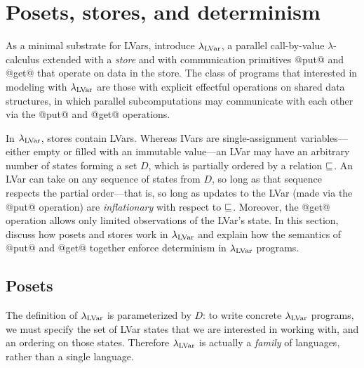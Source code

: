 \section{Posets, stores, and determinism}\label{s:lvars-lattices}

As a minimal substrate for LVars,  introduce $\lambda_{\textrm{LVar}}$, a
parallel call-by-value $\lambda$-calculus extended with a \emph{store}
and with communication primitives @put@ and @get@ that operate on data
in the store.  The class of programs that  interested in modeling
with $\lambda_{\textrm{LVar}}$ are those with explicit effectful operations on
shared data structures, in which parallel subcomputations may
communicate with each other via the @put@ and @get@ operations.

In $\lambda_{\textrm{LVar}}$, stores contain LVars.  Whereas IVars are
single-assignment variables---either empty or filled with an immutable
value---an LVar may have an arbitrary number of states forming a set
$D$, which is partially ordered by a relation $\sqsubseteq$.  An LVar can
take on any sequence of states from $D$, so long as that sequence
respects the partial order---that is, so long as updates to the LVar
(made via the @put@ operation) are \emph{inflationary} with respect to
$\sqsubseteq$.  Moreover, the @get@ operation allows only limited
observations of the LVar's state.  In this section, 
discuss how posets and stores work in $\lambda_{\textrm{LVar}}$ and explain how
the semantics of @put@ and @get@ together enforce determinism in
$\lambda_{\textrm{LVar}}$ programs.

\subsection{Posets}\label{subsection:lvars-lattices}

The definition of $\lambda_{\textrm{LVar}}$ is parameterized by $D$: to write
concrete $\lambda_{\textrm{LVar}}$ programs, we must specify the set of LVar
states that we are interested in working with, and an ordering on
those states.  Therefore $\lambda_{\textrm{LVar}}$ is actually a \emph{family} of
languages, rather than a single language.

